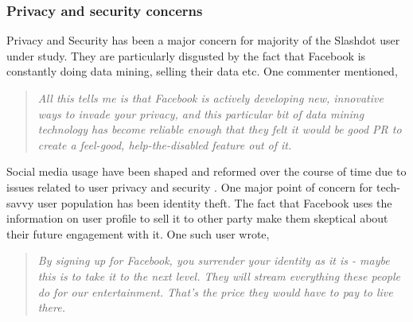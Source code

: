  \subsubsection{Privacy and security concerns }
 Privacy and Security has been a major concern for majority of the Slashdot user under study. They are particularly disgusted by the fact that Facebook is constantly doing data mining, selling their data etc. One commenter mentioned,
     \begin{quote}
         \textit{All this tells me is that Facebook is actively developing new, innovative ways to invade your privacy, and this particular bit of data mining technology has become reliable enough that they felt it would be good PR to create a feel-good, help-the-disabled feature out of it. }
     \end{quote}
     
     Social media usage have been shaped and reformed over the course of time due to issues related to user privacy and security \cite{vitak2015balancing}. One major point of concern for tech-savvy user population has been identity theft. The fact that Facebook uses the information on user profile to sell it to other party make them skeptical about their future engagement with it. One such user wrote,
     \begin{quote}
         \textit{By signing up for Facebook, you surrender your identity as it is - maybe this is to take it to the next level. They will stream everything these people do for our entertainment. That's the price they would have to pay to live there.}
    \end{quote}
    
